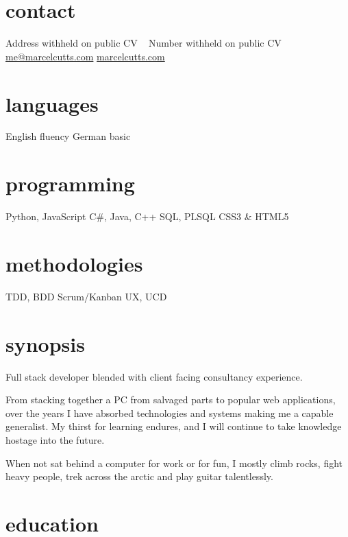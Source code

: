 \documentclass[]{friggeri-cv} %
\begin{document}


\begin{aside} %
\section{contact}
Address withheld on public CV
~
Number withheld on public CV
~
\href{mailto:me@marcelcutts.com}{me@marcelcutts.com}
\href{http://www.marcelcutts.com}{marcelcutts.com}
\section{languages}
English fluency
German basic
\section{programming}
Python, JavaScript
C\#, Java, C++
SQL, PLSQL
CSS3 \& HTML5
\section{methodologies}
TDD, BDD
Scrum/Kanban
UX, UCD
\end{aside}


\section{synopsis}

Full stack developer blended with client facing consultancy experience.

From stacking together a PC from salvaged parts to popular web applications, over the years I have absorbed technologies and systems making me a capable generalist. My thirst for learning endures, and I will continue to take knowledge hostage into the future. 

When not sat behind a computer for work or for fun, I mostly climb rocks, fight heavy people, trek across the arctic and play guitar talentlessly.

\section{education}
\end{document}

